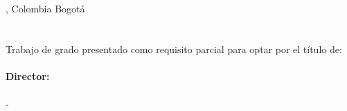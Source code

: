 {\newpage
\thispagestyle{empty}
\begin{center}
    \begin{figure}
        \centering
        \end{figure}
    \vspace{2.5cm}
    \textbf{\Huge \thesisname} \\ 
    \vspace{2.5cm}
    \textbf{\Large \studentname} \\
    \vspace{5.0cm}
    \faculty \\ \department \\
    \sede, Colombia Bogotá\\
    \issuedate
    \newpage 
    \thispagestyle{empty}
    \vspace{2.0cm}
    \textbf{\Huge \thesisname} \\
    \vspace{3.0cm}
    \textbf{\Large \studentname} \\
    \vspace{3.0cm}
    \small Trabajo de grado presentado como requisito parcial para optar por el título de: \\
    {\bfseries \academictitle}\\
    \vspace{3.0cm}
    \textbf{Director:} \\
    \director \\
    \directortitle \; - \department \\
    \faculty \\
    \university \\ 
    \vspace{5cm}
    \university \\
    \faculty \\
    \department \\
    \issuedate
\end{center}

}
